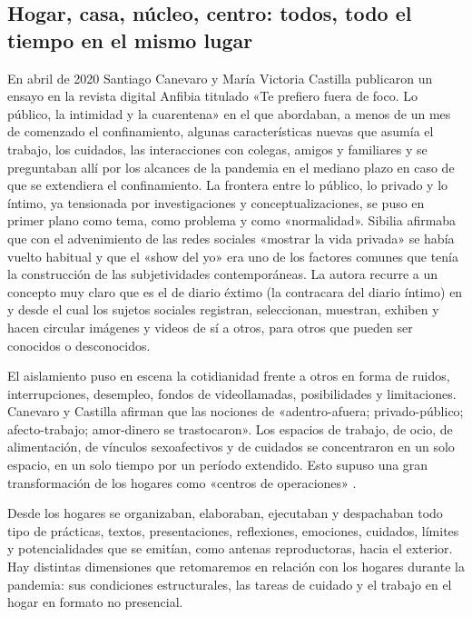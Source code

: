 \begin{refsection}
\section[Hogar, casa, núcleo, centro: todos, todo el tiempo en el mismo lugar]{Hogar, casa, núcleo, centro: todos, todo el tiempo en el mismo lugar}
\label{cap-28.hogar-casa-nucleo-centro-todos-todo-el-tiempo-en-el-mismo-lugar}
En abril de 2020 Santiago Canevaro y María Victoria Castilla publicaron un ensayo en la revista digital Anfibia titulado «Te prefiero fuera de foco. Lo público, la intimidad y la cuarentena» en el que abordaban, a menos de un mes de comenzado el confinamiento, algunas características nuevas que asumía el trabajo, los cuidados, las interacciones con colegas, amigos y familiares y se preguntaban allí por los alcances de la pandemia en el mediano plazo en caso de que se extendiera el confinamiento. La frontera entre lo público, lo privado y lo íntimo, ya tensionada por investigaciones y conceptualizaciones, se puso en primer plano como tema, como problema y como «normalidad». Sibilia \protect\parencite*{4222-SIBILIA2008} afirmaba que con el advenimiento de las redes sociales «mostrar la vida privada» se había vuelto habitual y que el «show del yo» era uno de los factores comunes que tenía la construcción de las subjetividades contemporáneas. La autora recurre a un concepto muy claro que es el de diario éxtimo (la contracara del diario íntimo) en y desde el cual los sujetos sociales registran, seleccionan, muestran, exhiben y hacen circular imágenes y videos de sí a otros, para otros que pueden ser conocidos o desconocidos.

El aislamiento puso en escena la cotidianidad frente a otros en forma de ruidos, interrupciones, desempleo, fondos de videollamadas, posibilidades y limitaciones. Canevaro y Castilla \protect\parencite*{4224-CANEVARO2020} afirman que las nociones de «adentro-afuera; privado-público; afecto-trabajo; amor-dinero se trastocaron». Los espacios de trabajo, de ocio, de alimentación, de vínculos sexoafectivos y de cuidados se concentraron en un solo espacio, en un solo tiempo por un período extendido. Esto supuso una gran transformación de los hogares como «centros de operaciones» \protect\parencite{4262-DUEK2020}.

Desde los hogares se organizaban, elaboraban, ejecutaban y despachaban todo tipo de prácticas, textos, presentaciones, reflexiones, emociones, cuidados, límites y potencialidades que se emitían, como antenas reproductoras, hacia el exterior. Hay distintas dimensiones que retomaremos en relación con los hogares durante la pandemia: sus condiciones estructurales, las tareas de cuidado y el trabajo en el hogar en formato no presencial.


\end{refsection}
